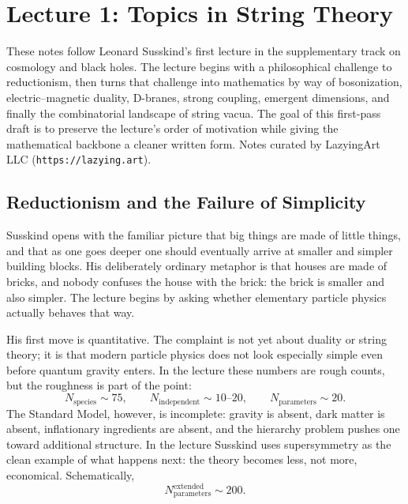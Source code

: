 \chapter{Lecture 1: Topics in String Theory}

These notes follow Leonard Susskind's first lecture in the supplementary track on cosmology and black holes. The lecture begins with a philosophical challenge to reductionism, then turns that challenge into mathematics by way of bosonization, electric--magnetic duality, D-branes, strong coupling, emergent dimensions, and finally the combinatorial landscape of string vacua. The goal of this first-pass draft is to preserve the lecture's order of motivation while giving the mathematical backbone a cleaner written form. Notes curated by LazyingArt LLC (\texttt{https://lazying.art}).

\section{Reductionism and the Failure of Simplicity}

Susskind opens with the familiar picture that big things are made of little things, and that as one goes deeper one should eventually arrive at smaller and simpler building blocks. His deliberately ordinary metaphor is that houses are made of bricks, and nobody confuses the house with the brick: the brick is smaller and also simpler. The lecture begins by asking whether elementary particle physics actually behaves that way.

His first move is quantitative. The complaint is not yet about duality or string theory; it is that modern particle physics does not look especially simple even before quantum gravity enters. In the lecture these numbers are rough counts, but the roughness is part of the point:
\begin{equation}
N_{\mathrm{species}} \sim 75,
\qquad
N_{\mathrm{independent}} \sim 10\text{--}20,
\qquad
N_{\mathrm{parameters}} \sim 20.
\end{equation}
The Standard Model, however, is incomplete: gravity is absent, dark matter is absent, inflationary ingredients are absent, and the hierarchy problem pushes one toward additional structure. In the lecture Susskind uses supersymmetry as the clean example of what happens next: the theory becomes less, not more, economical. Schematically,
\begin{equation}
N_{\mathrm{parameters}}^{\mathrm{extended}} \sim 200.
\end{equation}

